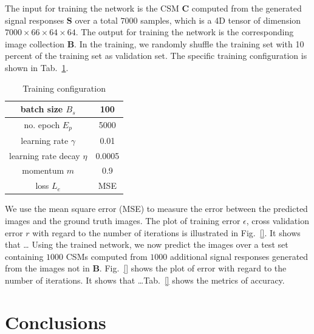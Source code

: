 \documentclass{article}
\begin{document}
The input for training the network is the CSM $\mathbf{C}$ computed from the generated signal responses $\mathbf{S}$ over a total $7000$ samples, which is a 4D tensor of dimension $7000 \times 66 \times 64 \times 64$. The output for training the network is the corresponding image collection $\mathbf{B}$. In the training, we randomly shuffle the training set with 10 percent of the training set as validation set. The specific training configuration is shown in Tab.~\ref{tab:train_config}.
\begin{table}[htbp]
\center
\caption{Training configuration}
  \begin{tabular}{ c | c }
    \hline
    batch size $B_s$ & 100 \\
    \hline
    no. epoch $E_p$ & 5000 \\
    \hline
    learning rate $\gamma$ & 0.01 \\
    \hline
    learning rate decay $\eta$ & 0.0005 \\
    \hline
    momentum $m$ & 0.9 \\
    \hline
    loss $L_e$ & MSE \\
    \hline
  \end{tabular}
  \label{tab:train_config}
\end{table}
We use the mean square error (MSE) to measure the error between the predicted images and the ground truth images.
The plot of training error $\epsilon$, cross validation error $r$ with regard to the number of iterations is illustrated in Fig.~\ref{}. It shows that \ldots 
Using the trained network, we now predict the images over a test set containing $1000$ CSMs computed from $1000$ additional signal responses generated from the images not in $\mathbf{B}$. Fig.~\ref{} shows the plot of error with regard to the number of iterations. It shows that \ldots Tab.~\ref{} shows the metrics of accuracy.

\section{Conclusions}
\label{sec:conclusions}



\end{document}
